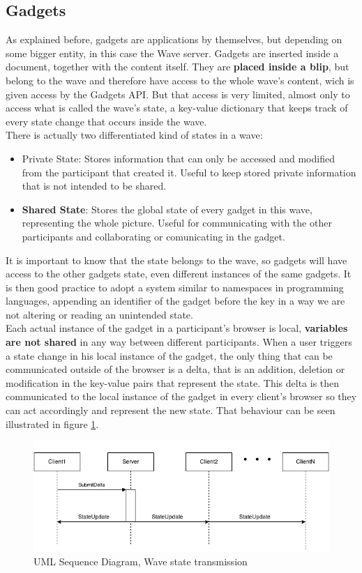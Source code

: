 \subsection{Gadgets}
As explained before, gadgets are applications by themselves, but depending on some bigger entity, in this case the Wave server. Gadgets are inserted inside a document, together with the content itself. They are \textbf{placed inside a blip}, but belong to the wave and therefore have access to the whole wave's content, wich is given access by the Gadgets API. But that access is very limited, almost only to access what is called the wave's state, a key-value dictionary that keeps track of every state change that occurs inside the wave.\\[.2cm]
There is actually two differentiated kind of states in a wave:
\begin{itemize}
  \item Private State: Stores information that can only be accessed and modified from the participant that created it. Useful to keep stored private information that is not intended to be shared.
  \item \textbf{Shared State}: Stores the global state of every gadget in this wave, representing the whole picture. Useful for communicating with the other participants and collaborating or comunicating in the gadget.
\end{itemize}
It is important to know that the state belongs to the wave, so gadgets will have access to the other gadgets state, even different instances of the same gadgets. It is then good practice to adopt a system similar to namespaces in programming languages, appending an identifier of the gadget before the key in a way we are not altering or reading an unintended state.\\[.2cm]
Each actual instance of the gadget in a participant's browser is local, \textbf{variables are not shared} in any way between different participants. When a user triggers a state change in his local instance of the gadget, the only thing that can be communicated outside of the browser is a delta, that is an addition, deletion or modification in the key-value pairs that represent the state. This delta is then communicated to the local instance of the gadget in every client's browser so they can act accordingly and represent the new state. That behaviour can be seen illustrated in figure \ref{fig:wave_state}.
\begin{figure}[H]
  \center
    \includegraphics[keepaspectratio, scale=0.6]{Media/Diagrams/Wave/StateSequence.png}
  \caption{UML Sequence Diagram, Wave state transmission}
  \label{fig:wave_state}
\end{figure}
